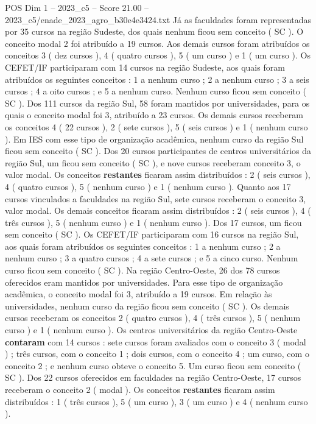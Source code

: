 \begin{textsample}{POS Dim 1 – 2023\_c5 – Score 21.00 – 2023\_c5/enade\_2023\_agro\_b30e4e3424.txt}
Já as faculdades foram representadas por 35 cursos na região Sudeste, dos quais nenhum ficou sem conceito ( SC ).
O conceito modal 2 foi atribuído a 19 cursos.
Aos demais cursos foram atribuídos os conceitos 3 ( dez cursos ), 4 ( quatro cursos ), 5 ( um curso ) e 1 ( um curso ).
Os CEFET/IF participaram com 14 cursos na região Sudeste, aos quais foram atribuídos os seguintes conceitos : 1 a nenhum curso ; 2 a nenhum curso ; 3 a seis cursos ; 4 a oito cursos ; e 5 a nenhum curso.
Nenhum curso ficou sem conceito ( SC ).
Dos 111 cursos da região Sul, 58 foram mantidos por universidades, para os quais o conceito modal foi 3, atribuído a 23 cursos.
Os demais cursos receberam os conceitos 4 ( 22 cursos ), 2 ( sete cursos ), 5 ( seis cursos ) e 1 ( nenhum curso ).
Em IES com esse tipo de organização acadêmica, nenhum curso da região Sul ficou sem conceito ( SC ).
Dos 20 cursos participantes de centros universitários da região Sul, um ficou sem conceito ( SC ), e nove cursos receberam conceito 3, o valor modal.
Os conceitos \textbf{restantes} ficaram assim distribuídos : 2 ( seis cursos ), 4 ( quatro cursos ), 5 ( nenhum curso ) e 1 ( nenhum curso ).
Quanto aos 17 cursos vinculados a faculdades na região Sul, sete cursos receberam o conceito 3, valor modal.
Os demais conceitos ficaram assim distribuídos : 2 ( seis cursos ), 4 ( três cursos ), 5 ( nenhum curso ) e 1 ( nenhum curso ).
Dos 17 cursos, um ficou sem conceito ( SC ).
Os CEFET/IF participaram com 16 cursos na região Sul, aos quais foram atribuídos os seguintes conceitos : 1 a nenhum curso ; 2 a nenhum curso ; 3 a quatro cursos ; 4 a sete cursos ; e 5 a cinco curso.
Nenhum curso ficou sem conceito ( SC ).
Na região Centro-Oeste, 26 dos 78 cursos oferecidos eram mantidos por universidades.
Para esse tipo de organização acadêmica, o conceito modal foi 3, atribuído a 19 cursos.
Em relação às universidades, nenhum curso da região ficou sem conceito ( SC ).
Os demais cursos receberam os conceitos 2 ( quatro cursos ), 4 ( três cursos ), 5 ( nenhum curso ) e 1 ( nenhum curso ).
Os centros universitários da região Centro-Oeste \textbf{contaram} com 14 cursos : sete cursos foram avaliados com o conceito 3 ( modal ) ; três cursos, com o conceito 1 ; dois cursos, com o conceito 4 ; um curso, com o conceito 2 ; e nenhum curso obteve o conceito 5.
Um curso ficou sem conceito ( SC ).
Dos 22 cursos oferecidos em faculdades na região Centro-Oeste, 17 cursos receberam o conceito 2 ( modal ).
Os conceitos \textbf{restantes} ficaram assim distribuídos : 1 ( três cursos ), 5 ( um curso ), 3 ( um curso ) e 4 ( nenhum curso ).

\end{textsample}
